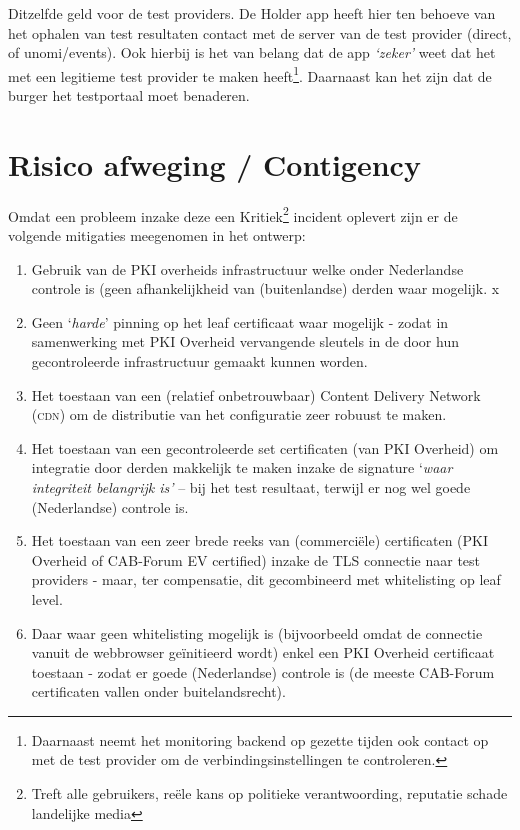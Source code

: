 \documentclass[11.0pt,twoside,openright]{report}
\def\testsonly{x}
\begin{document}
Ditzelfde geld voor de test providers.
\fi
De Holder app heeft hier ten behoeve van het ophalen van test resultaten contact met de server van de test provider (direct, of unomi/events). Ook hierbij is het van belang dat de app \emph{`zeker'} weet dat het met een legitieme test provider te maken heeft\footnote{Daarnaast neemt het monitoring backend op gezette tijden ook contact op met de test provider om de verbindingsinstellingen te controleren.}. Daarnaast kan het zijn dat de burger het testportaal moet benaderen.

\section{Risico afweging / Contigency}

Omdat een probleem inzake deze een  Kritiek\footnote{Treft alle gebruikers, reële kans op politieke verantwoording, reputatie schade landelijke media} incident oplevert zijn er de volgende mitigaties meegenomen in het ontwerp:

\begin{enumerate}
\item Gebruik van de PKI overheids infrastructuur welke onder Nederlandse controle is (geen afhankelijkheid van (buitenlandse) derden waar mogelijk.
\ifdefined\testsonly
\else\item Geen `\emph{harde}' pinning op het leaf certificaat waar mogelijk - zodat in samenwerking met PKI Overheid vervangende sleutels in de door hun gecontroleerde infrastructuur gemaakt kunnen worden.
\item Het toestaan van een (relatief onbetrouwbaar) Content Delivery Network (\textsc{cdn}) om de distributie van het configuratie zeer robuust te maken.
\fi
\item Het toestaan van een gecontroleerde set certificaten (van PKI Overheid) om integratie door derden makkelijk te maken inzake de signature `\emph{waar integriteit belangrijk is'} -- bij het test resultaat, terwijl er nog wel goede (Nederlandse) controle is.
\item Het toestaan van een zeer brede reeks van (commerciële) certificaten (PKI Overheid of CAB-Forum EV certified) inzake de TLS connectie naar test providers - maar, ter compensatie, dit gecombineerd met whitelisting op leaf level.
\item Daar waar geen whitelisting mogelijk is (bijvoorbeeld omdat de connectie vanuit de webbrowser geïnitieerd wordt) enkel een PKI Overheid certificaat toestaan - zodat er goede (Nederlandse) controle is (de meeste CAB-Forum certificaten vallen onder buitelandsrecht).
\end{enumerate}
\end{document}
